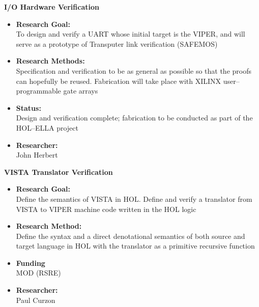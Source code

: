\begin{center}{\bf I/O Hardware Verification}\end{center}
\begin{itemize}
\item {\bf Research Goal:} $\;$ \\
To design and verify a {\small UART} whose initial target is the 
{\small VIPER}, and will serve as a prototype of Transputer link verification
({\small SAFEMOS})
\item {\bf Research Methods:} $\;$ \\
Specification and verification to be as general as possible so that the
proofs can hopefully be reused.  Fabrication will take place with 
{\small XILINX} user--programmable gate arrays
\item {\bf Status:}$\;$ \\
Design and verification complete; fabrication to be conducted as
part of the {\small HOL}--{\small ELLA} project
\item {\bf Researcher:} $\;$ \\
John Herbert
\end{itemize}

\begin{center}{\bf VISTA Translator Verification}\end{center}
\begin{itemize}
\item {\bf Research Goal:} $\;$ \\
Define the semantics of {\small VISTA} in {\small HOL}.
Define and verify a translator from {\small VISTA} to {\small VIPER} 
machine code written in the {\small HOL} logic  
\item {\bf Research Method:} $\;$ \\
Define the syntax and a direct denotational semantics of both source and 
target language in {\small HOL} with the translator as a primitive recursive 
function
\item {\bf Funding} $\;$ \\
{\small MOD} ({\small RSRE})
\item {\bf Researcher:} $\;$ \\
Paul Curzon
\end{itemize}

